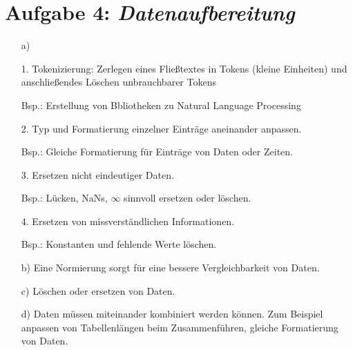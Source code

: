 \section*{Aufgabe 4: \emph{Datenaufbereitung}}

\begin{itemize}

\item[a)]
\item[1.] Tokenizierung: Zerlegen eines Fließtextes in Tokens (kleine Einheiten) und anschließendes Löschen unbrauchbarer Tokens
\item[Bsp.:] Erstellung von Bbliotheken zu Natural Language Processing
\item[2.] Typ und Formatierung einzelner Einträge aneinander anpassen.
\item[Bsp.:] Gleiche Formatierung für Einträge von Daten oder Zeiten.
\item[3.] Ersetzen nicht eindeutiger Daten.
\item[Bsp.:] Lücken, NaNs, $\infty$ sinnvoll ersetzen oder löschen.
\item[4.] Ersetzen von missverständlichen Informationen.
\item[Bsp.:] Konstanten und fehlende Werte löschen.

\item[b)] Eine Normierung sorgt für eine bessere Vergleichbarkeit von Daten.
\item[c)] Löschen oder ersetzen von Daten.
\item[d)] Daten müssen miteinander kombiniert werden können. Zum Beispiel anpassen von Tabellenlängen beim Zusammenführen, gleiche Formatierung von Daten.
\end{itemize}